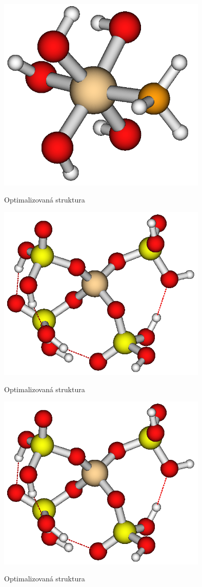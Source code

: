 \documentclass[
  digital, %
  table,   %
  lof,     %
  lot,     %
]{fithesis3}
\begin{document}
  \begin{figure}[h]
\caption{Optimalizovaná struktura  }
  \center
  \includegraphics[width=10cm]{obr_h5sio5ch3.png}
  \label{obr_h5sio5ch3}
  \end{figure}

  \begin{figure}[ht]
\caption{Optimalizovaná struktura  }
  \center
  \includegraphics[width=10cm]{obr_sio4_h2po3_4.png}
  \label{obr_sio4_h2po3_4}
  \end{figure}

\begin{figure}[ht]
\caption{Optimalizovaná struktura  }
  \center
  \includegraphics[width=10cm]{obr_sio4_h2po3_4.png}
  \label{obr_sio4_h2po3_4}
  \end{figure}
\end{document}
